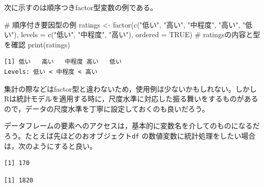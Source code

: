 \documentclass[
  a4paper,
]{ltjsbook}
\newenvironment{Shaded}{\begin{snugshade}}{\end{snugshade}}
\newcommand{\AttributeTok}[1]{\textcolor[rgb]{0.40,0.45,0.13}{#1}}
\newcommand{\CommentTok}[1]{\textcolor[rgb]{0.37,0.37,0.37}{#1}}
\newcommand{\ConstantTok}[1]{\textcolor[rgb]{0.56,0.35,0.01}{#1}}
\newcommand{\FunctionTok}[1]{\textcolor[rgb]{0.28,0.35,0.67}{#1}}
\newcommand{\NormalTok}[1]{\textcolor[rgb]{0.00,0.23,0.31}{#1}}
\newcommand{\OtherTok}[1]{\textcolor[rgb]{0.00,0.23,0.31}{#1}}
\newcommand{\SpecialCharTok}[1]{\textcolor[rgb]{0.37,0.37,0.37}{#1}}
\newcommand{\StringTok}[1]{\textcolor[rgb]{0.13,0.47,0.30}{#1}}
\begin{document}
次に示すのは順序つきfactor型変数の例である。

\begin{Shaded}
\begin{Highlighting}[]
\CommentTok{\# 順序付き要因型の例}
\NormalTok{ratings }\OtherTok{\textless{}{-}} \FunctionTok{factor}\NormalTok{(}\FunctionTok{c}\NormalTok{(}\StringTok{"低い"}\NormalTok{, }\StringTok{"高い"}\NormalTok{, }\StringTok{"中程度"}\NormalTok{, }\StringTok{"高い"}\NormalTok{, }\StringTok{"低い"}\NormalTok{), }
                  \AttributeTok{levels =} \FunctionTok{c}\NormalTok{(}\StringTok{"低い"}\NormalTok{, }\StringTok{"中程度"}\NormalTok{, }\StringTok{"高い"}\NormalTok{), }
                  \AttributeTok{ordered =} \ConstantTok{TRUE}\NormalTok{)}
\CommentTok{\# ratingsの内容と型を確認}
\FunctionTok{print}\NormalTok{(ratings)}
\end{Highlighting}
\end{Shaded}

\begin{verbatim}
[1] 低い   高い   中程度 高い   低い  
Levels: 低い < 中程度 < 高い
\end{verbatim}

集計の際などはfactor型と違わないため，使用例は少ないかもしれない。しかしRは統計モデルを適用する時に，尺度水準に対応した振る舞いをするものがあるので，データの尺度水準を丁寧に設定しておくのも良いだろう。

データフレームの要素へのアクセスは，基本的に変数名を介してのものになるだろう。たとえば先ほどのおオブジェクト\texttt{df}
の数値変数に統計処理をしたい場合は，次のようにすると良い。

\begin{Shaded}
\end{Shaded}

\begin{verbatim}
[1] 170
\end{verbatim}

\begin{Shaded}
\end{Shaded}

\begin{verbatim}
[1] 1820
\end{verbatim}
\end{document}
